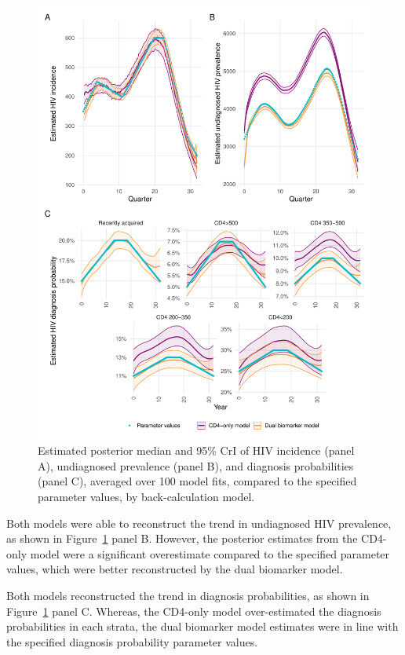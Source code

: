\begin{figure}[htbp!]
  \centering
  \includegraphics[width=\textwidth]{sim_estimates.pdf}
  \caption[Estimated posterior median and 95\% CrI of HIV incidence, undiagnosed prevalence, and diagnosis probabilities, by back-calculation model]{Estimated posterior median and 95\% CrI of HIV incidence (panel A), undiagnosed prevalence (panel B), and diagnosis probabilities (panel C), averaged over 100 model fits, compared to the specified parameter values, by back-calculation model.}\label{fig:sim_estimates}
\end{figure}

Both models were able to reconstruct the trend in undiagnosed HIV prevalence, as shown in Figure~\ref{fig:sim_estimates} panel B. However, the posterior estimates from the CD4-only model were a significant overestimate compared to the specified parameter values, which were better reconstructed by the dual biomarker model.

Both models reconstructed the trend in diagnosis probabilities, as shown in Figure~\ref{fig:sim_estimates} panel C. Whereas, the CD4-only model over-estimated the diagnosis probabilities in each strata, the dual biomarker model estimates were in line with the specified diagnosis probability parameter values.

